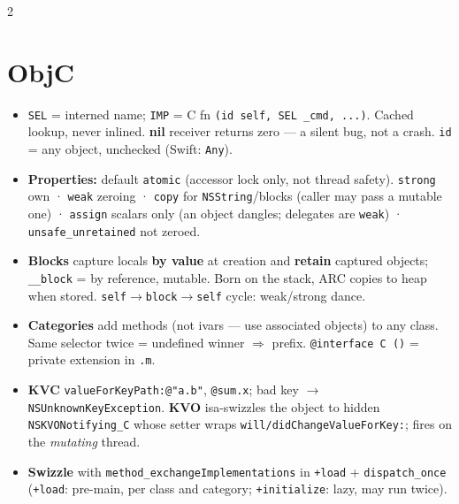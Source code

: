 \documentclass[8pt]{extarticle}
\begin{document}
\begin{multicols}{2}
\raggedright

\section{ObjC}
\begin{itemize}
  \item \texttt{SEL} = interned name; \texttt{IMP} = C fn
        \texttt{(id self, SEL \_cmd, ...)}. Cached lookup, never inlined.
        \textbf{nil} receiver returns zero — a silent bug, not a crash.
        \texttt{id} = any object, unchecked (Swift: \texttt{Any}).
  \item \textbf{Properties:} default \texttt{atomic} (accessor lock only, not
        thread safety). \texttt{strong} own · \texttt{weak} zeroing ·
        \texttt{copy} for \texttt{NSString}/blocks (caller may pass a mutable
        one) · \texttt{assign} scalars only (an object dangles; delegates are
        \texttt{weak}) · \texttt{unsafe\_unretained} not zeroed.
  \item \textbf{Blocks} capture locals \textbf{by value} at creation and
        \textbf{retain} captured objects; \texttt{\_\_block} = by reference,
        mutable. Born on the stack, ARC copies to heap when stored.
        \texttt{self$\to$block$\to$self} cycle: weak/strong dance.
  \item \textbf{Categories} add methods (not ivars — use associated objects)
        to any class. Same selector twice = undefined winner $\Rightarrow$
        prefix. \texttt{@interface C ()} = private extension in \texttt{.m}.
  \item \textbf{KVC} \texttt{valueForKeyPath:@"a.b"}, \texttt{@sum.x};
        bad key $\to$ \texttt{NSUnknownKeyException}. \textbf{KVO}
        isa-swizzles the object to hidden \texttt{NSKVONotifying\_C} whose
        setter wraps \texttt{will/didChangeValueForKey:}; fires on the
        \emph{mutating} thread.
  \item \textbf{Swizzle} with \texttt{method\_exchangeImplementations} in
        \texttt{+load} + \texttt{dispatch\_once} (\texttt{+load}: pre-main,
        per class and category; \texttt{+initialize}: lazy, may run twice).
\end{itemize}


\end{multicols}
\end{document}
